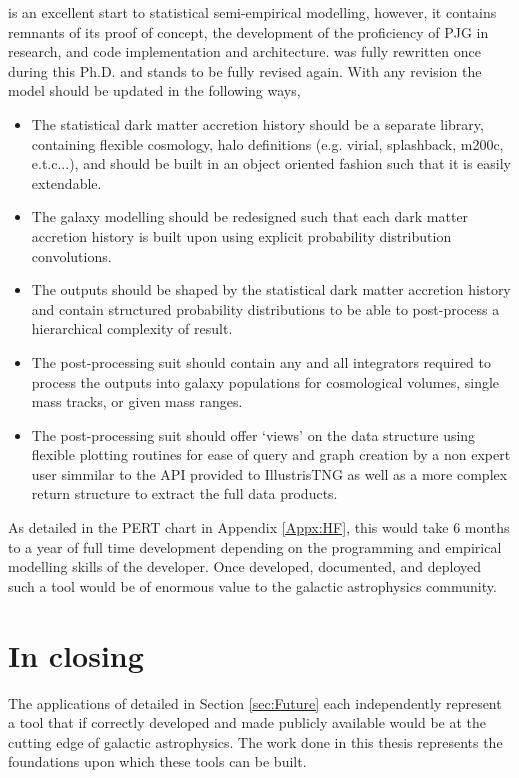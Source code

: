 \steel is an excellent start to statistical semi-empirical modelling, however, it contains remnants of its proof of concept, the development of the proficiency of PJG in research, and code implementation and architecture. \steel was fully rewritten once during this Ph.D. and stands to be fully revised again. With any revision the model should be updated in the following ways,

\begin{itemize}
    \item The statistical dark matter accretion history should be a separate library, containing flexible cosmology, halo definitions (e.g. virial, splashback, m200c, e.t.c...), and should be built in an object oriented fashion such that it is easily extendable.
    \item The galaxy modelling should be redesigned such that each dark matter accretion history is built upon using explicit probability distribution convolutions.
    \item The outputs should be shaped by the statistical dark matter accretion history and contain structured probability distributions to be able to post-process a hierarchical complexity of result.
    \item The post-processing suit should contain any and all integrators required to process the outputs into galaxy populations for cosmological volumes, single mass tracks, or given mass ranges.
    \item The post-processing suit should offer `views' on the data structure using flexible plotting routines for ease of query and graph creation by a non expert user simmilar to the API provided to IllustrisTNG \cite[][https://www.tng-project.org/data/vis/]{Nelson2018TheRelease} as well as a more complex return structure to extract the full data products.
\end{itemize}

As detailed in the PERT chart in Appendix \ref{Appx:HF}, this would take 6 months to a year of full time development depending on the programming and empirical modelling skills of the developer. Once developed, documented, and deployed such a tool would be of enormous value to the galactic astrophysics community. 

\section{In closing}

The applications of \steel detailed in Section \ref{sec:Future} each independently represent a tool that if correctly developed and made publicly available would be at the cutting edge of galactic astrophysics. The work done in this thesis represents the foundations upon which these tools can be built. 

